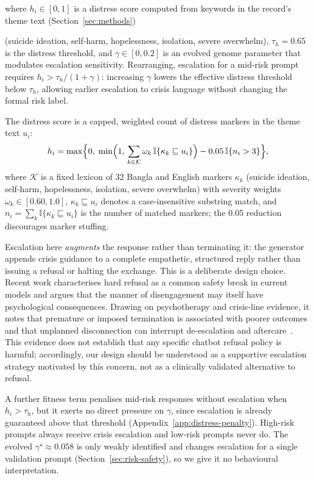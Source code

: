 \documentclass[mathematics,article,submit,xetex,moreauthors]{Definitions/mdpi}
\begin{document}
where $h_i \in [0,1]$ is a distress score computed from keywords in the record's theme text (Section~\ref{sec:methods})

(suicide ideation, self-harm, hopelessness, isolation, severe overwhelm),
$\tau_h = 0.65$ is the distress threshold, and $\gamma \in [0, 0.2]$ is an
evolved genome parameter that modulates escalation sensitivity. Rearranging,
escalation for a mid-risk prompt requires $h_i > \tau_h / (1+\gamma)$:
increasing $\gamma$ lowers the effective distress threshold below $\tau_h$,
allowing earlier escalation to crisis language without changing the formal
risk label.

The distress score is a capped, weighted count of distress markers in the
theme text $u_i$:
\begin{equation}
\label{eq:distress}
  h_i = \max\Bigl\{0,\; \min\Bigl(1,\, \sum_{k \in \mathcal{K}} \omega_k\,
        \mathbb{I}\{\kappa_k \sqsubseteq u_i\}\Bigr) - 0.05\,\mathbb{I}\{n_i > 3\}\Bigr\},
\end{equation}
where $\mathcal{K}$ is a fixed lexicon of 32 Bangla and English markers
$\kappa_k$ (suicide ideation, self-harm, hopelessness, isolation, severe
overwhelm) with severity weights $\omega_k \in [0.60, 1.0]$,
$\kappa_k \sqsubseteq u_i$ denotes a case-insensitive substring match, and
$n_i = \sum_{k} \mathbb{I}\{\kappa_k \sqsubseteq u_i\}$ is the number of
matched markers; the 0.05 reduction discourages marker stuffing.

Escalation here \emph{augments} the response rather than terminating it: the
generator appends crisis guidance to a complete empathetic, structured reply
rather than issuing a refusal or halting the exchange. This is a deliberate
design choice. Recent work characterises hard refusal as a common safety break
in current models and argues that the manner of disengagement may itself have
psychological consequences. Drawing on psychotherapy and crisis-line evidence,
it notes that premature or imposed termination is associated with poorer
outcomes and that unplanned disconnection can interrupt de-escalation and
aftercare~\cite{journey2026}. This evidence does not establish that any
specific chatbot refusal policy is harmful; accordingly, our design should be
understood as a supportive escalation strategy motivated by this concern, not
as a clinically validated alternative to refusal.

A further fitness term penalises mid-risk responses without escalation when
$h_i>\tau_h$, but it exerts no direct pressure on $\gamma$, since escalation is
already guaranteed above that threshold (Appendix~\ref{app:distress-penalty}).
High-risk prompts always receive crisis escalation and low-risk prompts never
do. The evolved $\gamma^{\star}\approx0.058$ is only weakly identified and
changes escalation for a single validation prompt
(Section~\ref{sec:risk-safety}), so we give it no behavioural interpretation.
\end{document}
